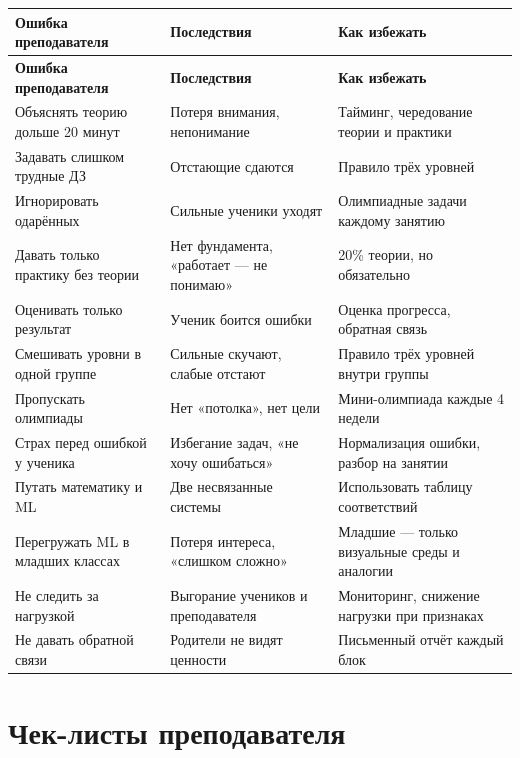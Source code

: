 \documentclass[12pt,a4paper]{article}
\begin{document}
\begin{longtable}{L{4.2cm}L{5.4cm}L{5.4cm}}
\toprule
\textbf{Ошибка преподавателя} & \textbf{Последствия} & \textbf{Как избежать}\\
\midrule
\endfirsthead

\toprule
\textbf{Ошибка преподавателя} & \textbf{Последствия} & \textbf{Как избежать}\\
\midrule
\endhead

Объяснять теорию дольше 20 минут & Потеря внимания, непонимание & Тайминг, чередование
теории и практики\\
\addlinespace
Задавать слишком трудные ДЗ & Отстающие сдаются & Правило трёх уровней\\
\addlinespace
Игнорировать одарённых & Сильные ученики уходят & Олимпиадные задачи
каждому занятию\\
\addlinespace
Давать только практику без теории & Нет фундамента, «работает --- не понимаю» & 20\%
теории, но обязательно\\
\addlinespace
Оценивать только результат & Ученик боится ошибки & Оценка прогресса,
обратная связь\\
\addlinespace
Смешивать уровни в одной группе & Сильные скучают, слабые отстают & Правило
трёх уровней внутри группы\\
\addlinespace
Пропускать олимпиады & Нет «потолка», нет цели & Мини-олимпиада каждые 4 недели\\
\addlinespace
Страх перед ошибкой у ученика & Избегание задач, «не хочу ошибаться» & Нормализация
ошибки, разбор на занятии\\
\addlinespace
Путать математику и ML & Две несвязанные системы & Использовать
таблицу соответствий\\
\addlinespace
Перегружать ML в младших классах & Потеря интереса, «слишком сложно» & Младшие ---
только визуальные среды и аналогии\\
\addlinespace
Не следить за нагрузкой & Выгорание учеников и преподавателя & Мониторинг,
снижение нагрузки при признаках\\
\addlinespace
Не давать обратной связи & Родители не видят ценности & Письменный отчёт
каждый блок\\
\bottomrule
\end{longtable}

\newpage
\section{Чек-листы преподавателя}
\end{document}
